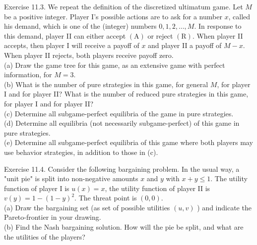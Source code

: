 \documentclass[12pt]{article}
\begin{document}
Exercise 11.3. We repeat the definition of the discretized ultimatum game. Let $M$ be a positive integer. Player I's possible actions are to ask for a number $x$, called his demand, which is one of the (integer) numbers $0,1,2, \ldots, M$. In response to this demand, player II can either accept $(\mathrm{A})$ or reject $(\mathrm{R})$. When player II accepts, then player I will receive a payoff of $x$ and player II a payoff of $M-x$. When player II rejects, both players receive payoff zero.\\
(a) Draw the game tree for this game, as an extensive game with perfect information, for $M=3$.\\
(b) What is the number of pure strategies in this game, for general $M$, for player I and for player II? What is the number of reduced pure strategies in this game, for player I and for player II?\\
(c) Determine all subgame-perfect equilibria of the game in pure strategies.\\
(d) Determine all equilibria (not necessarily subgame-perfect) of this game in pure strategies.\\
(e) Determine all subgame-perfect equilibria of this game where both players may use behavior strategies, in addition to those in (c).

Exercise 11.4. Consider the following bargaining problem. In the usual way, a "unit pie" is split into non-negative amounts $x$ and $y$ with $x+y \leq 1$. The utility function of player I is $u(x)=x$, the utility function of player II is $v(y)=1-(1-y)^{2}$. The threat point is $(0,0)$.\\
(a) Draw the bargaining set (as set of possible utilities $(u, v)$ ) and indicate the Pareto-frontier in your drawing.\\
(b) Find the Nash bargaining solution. How will the pie be split, and what are the utilities of the players?
\end{document}
